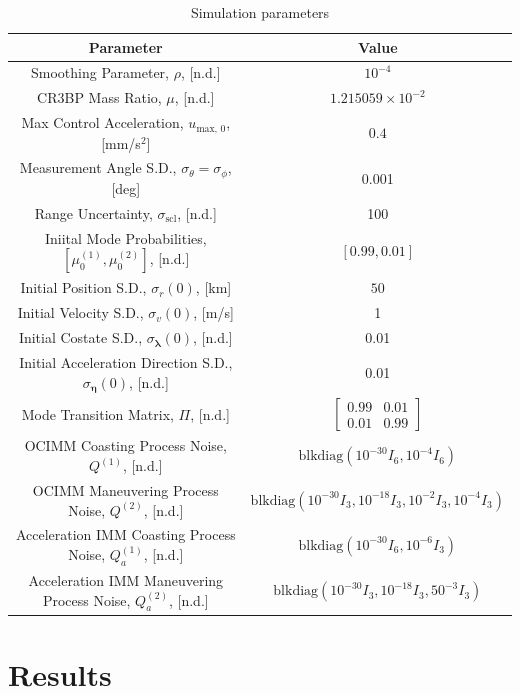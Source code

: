 \documentclass[letterpaper, preprint, paper,11pt]{AAS}	%
\begin{document}
\begin{table}
    \centering
    \caption{Simulation parameters}
    \begin{tabular}{c|c}
        Parameter & Value \\
        \hline
        Smoothing Parameter, $\rho$, [n.d.] & $10^{-4}$ \\
        CR3BP Mass Ratio, $\mu$, [n.d.] & $1.215059\times 10^{-2}$ \\
        Max Control Acceleration, $u_\text{max, 0}$, [mm/s$^2$] & $0.4$ \\
        Measurement Angle S.D., $\sigma_\theta=\sigma_\phi$, [deg] & 0.001 \\
        Range Uncertainty, $\sigma_\text{scl}$, [n.d.] & 100 \\
        Iniital Mode Probabilities, $[\mu_0^{(1)}, \mu_0^{(2)}]$, [n.d.] & $[0.99, 0.01]$ \\
        Initial Position S.D., $\sigma_r(0)$, [km] & $50$ \\
        Initial Velocity S.D., $\sigma_v(0)$, [m/s] & 1 \\
        Initial Costate S.D., $\sigma_{\bm{\lambda}}(0)$, [n.d.] & 0.01  \\
        Initial Acceleration Direction S.D., $\sigma_{\bm{\eta}}(0)$, [n.d.] & 0.01 \\
        Mode Transition Matrix, $\Pi$, [n.d.] & $\begin{bmatrix}
            0.99 & 0.01 \\
            0.01 & 0.99
        \end{bmatrix}$ \\
        OCIMM Coasting Process Noise, $Q^{(1)}$, [n.d.] & $\text{blkdiag}(10^{-30}I_6, 10^{-4}I_6)$ \\
        OCIMM Maneuvering Process Noise, $Q^{(2)}$, [n.d.] & $\text{blkdiag}(10^{-30}I_3, 10^{-18}I_3, 10^{-2}I_3, 10^{-4}I_3)$ \\
        Acceleration IMM Coasting Process Noise, $Q^{(1)}_a$, [n.d.] & $\text{blkdiag}(10^{-30}I_6, 10^{-6}I_3)$ \\
        Acceleration IMM Maneuvering Process Noise, $Q^{(2)}_a$, [n.d.] & $\text{blkdiag}(10^{-30}I_3, 10^{-18}I_3, 50^{-3}I_3)$
    \end{tabular}
    \label{tab:truth-parameters}
\end{table}

\section{Results}
\end{document}
